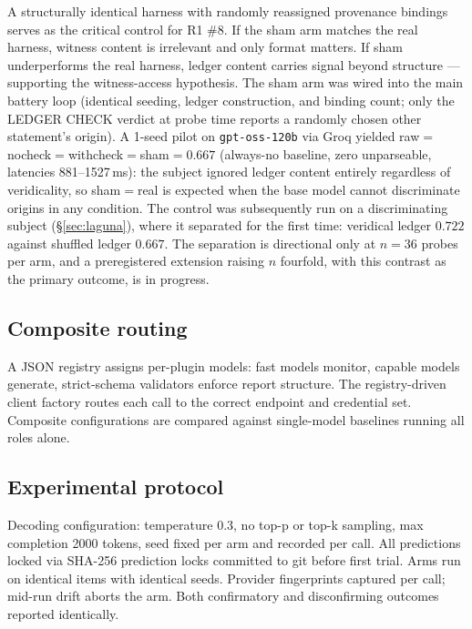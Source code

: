 \documentclass[11pt]{article}
\begin{document}
A structurally identical harness with randomly reassigned provenance
bindings serves as the critical control for R1 \#8. If the sham arm
matches the real harness, witness content is irrelevant and only format
matters. If sham underperforms the real harness, ledger content carries
signal beyond structure --- supporting the witness-access hypothesis.
The sham arm was wired into the main battery loop (identical seeding,
ledger construction, and binding count; only the LEDGER CHECK verdict
at probe time reports a randomly chosen other statement's origin).
A 1-seed pilot on \texttt{gpt-\allowbreak{}oss-\allowbreak{}120b} via Groq yielded
raw$=$nocheck$=$withcheck$=$sham$=0.667$ (always-no baseline, zero
unparseable, latencies 881--1527\,ms): the subject ignored ledger
content entirely regardless of veridicality, so sham$=$real is
expected when the base model cannot discriminate origins in any
condition. The control was subsequently run on a discriminating subject
(\S\ref{sec:laguna}), where it separated for the first time: veridical
ledger $0.722$ against shuffled ledger $0.667$. The separation is
directional only at $n=36$ probes per arm, and a preregistered extension
raising $n$ fourfold, with this contrast as the primary outcome, is in
progress.

\subsection{Composite routing}

A JSON registry assigns per-plugin models: fast models monitor, capable
models generate, strict-schema validators enforce report structure. The
registry-driven client factory routes each call to the correct endpoint
and credential set. Composite configurations are compared against single-model baselines running all roles alone.

\subsection{Experimental protocol}

Decoding configuration: temperature 0.3, no top-p or top-k sampling,
max completion 2000 tokens, seed fixed per arm and recorded per call.
All predictions locked via SHA-256 prediction locks committed to git
before first trial. Arms run on identical items with identical seeds.
Provider fingerprints captured per call; mid-run drift aborts the arm.
Both confirmatory and disconfirming outcomes reported identically.
\end{document}
